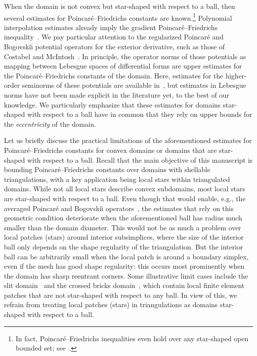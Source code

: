 \documentclass[10pt,a4paper]{article}
\newcommand{\todo}[1]{{\color{RedOrange}\textbf{#1}}}
\begin{document}
When the domain is not convex but star-shaped with respect to a ball,
then several estimates for Poincar\'e--Friedrichs constants are known.\footnote{In fact, Poincar\'e--Friedrichs inequalities even hold over any star-shaped open bounded set; see~\cite[Theorem~3.1]{hurri1988poincare}.}
Polynomial interpolation estimates already imply the gradient Poincar\'e--Friedrichs inequality~\cite{brenner2008mathematical,ern2021finite}. 
We pay particular attention to the regularized Poincar\'e and Bogovski\u{\i} potential operators for the exterior derivative,
such as those of Costabel and McIntosh~\cite{costabel2010bogovskiui}.
In principle, the operator norms of those potentials as mapping between Lebesgue spaces of differential forms 
are upper estimates for the Poincar\'e--Friedrichs constants of the domain. 
Here, estimates for the higher-order seminorms of these potentials are available in~\cite{guzman2021estimation}, 
but estimates in Lebesgue norms have not been made explicit in the literature yet, to the best of our knowledge.
We particularly emphasize that these estimates for domains star-shaped with respect to a ball have in common that they rely on upper bounds for the \emph{eccentricity} of the domain.


Let us briefly discuss the practical limitations of the aforementioned estimates for Poincar\'e--Friedrichs constants for convex domains or domains that are star-shaped with respect to a ball. 
Recall that the main objective of this manuscript is bounding Poincar\'e--Friedrichs constants over domains with shellable triangulations, with a key application being local stars within triangulated domains. 
While not all local stars describe convex subdomains, most local stars are star-shaped with respect to a ball. 
Even though that would enable, e.g., the averaged Poincar\'e and Bogovski\u{\i} operators~\cite{costabel2010bogovskiui}, 
the estimates that rely on this geometric condition deteriorate when the aforementioned ball has radius much smaller than the domain diameter. 
This would not be as much a problem over local patches (stars) around interior subsimplices, where the size of the interior ball only depends on the shape regularity of the triangulation. 
But the interior ball can be arbitrarily small when the local patch is around a boundary simplex, even if the mesh has good shape regularity: 
this occurs most prominently when the domain has sharp reentrant corners. Some illustrative limit cases include the slit domain~\cite{veeser2012poincare} and the crossed bricks domain~\cite{licht2019smoothed}, 
which contain local finite element patches that are not star-shaped with respect to any ball. 
In view of this, we refrain from treating local patches (stars) in triangulations as domains star-shaped with respect to a ball. 
\end{document}
